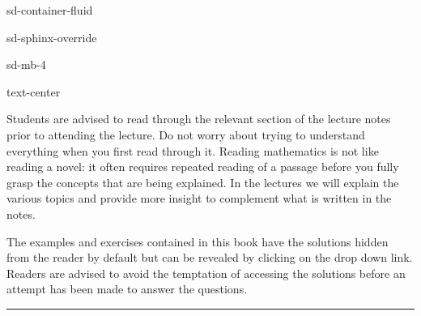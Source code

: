 \documentclass[letterpaper,10pt,english]{jupyterBook}
\begin{document}
\begin{sphinxuseclass}{sd-container-fluid}
\begin{sphinxuseclass}{sd-sphinx-override}
\begin{sphinxuseclass}{sd-mb-4}
\begin{sphinxuseclass}{text-center}
\end{sphinxuseclass}
\end{sphinxuseclass}
\end{sphinxuseclass}
\end{sphinxuseclass}
\sphinxAtStartPar
Students are advised to read through the relevant section of the lecture notes prior to attending the lecture. Do not worry about trying to understand everything when you first read through it. Reading mathematics is not like reading a novel: it often requires repeated reading of a passage before you fully grasp the concepts that are being explained. In the lectures we will explain the various topics and provide more insight to complement what is written in the notes.

\sphinxAtStartPar
The examples and exercises contained in this book have the solutions hidden from the reader by default but can be revealed by clicking on the drop down link. Readers are advised to avoid the temptation of accessing the solutions before an attempt has been made to answer the questions.


\bigskip\hrule\bigskip
\end{document}
